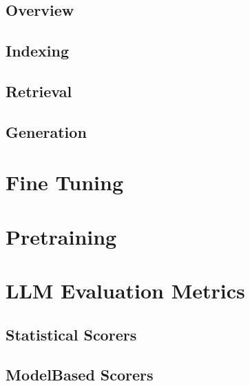 \documentclass[letterpaper,11pt,english]{sphinxmanual}
\begin{document}
\section{Overview}
\label{\detokenize{rag:overview}}

\section{Indexing}
\label{\detokenize{rag:indexing}}

\section{Retrieval}
\label{\detokenize{rag:retrieval}}

\section{Generation}
\label{\detokenize{rag:generation}}
\sphinxstepscope


\chapter{Fine Tuning}
\label{\detokenize{finetuning:fine-tuning}}\label{\detokenize{finetuning:finetuning}}\label{\detokenize{finetuning::doc}}
\sphinxstepscope


\chapter{Pre\sphinxhyphen{}training}
\label{\detokenize{pretraining:pre-training}}\label{\detokenize{pretraining:pretraining}}\label{\detokenize{pretraining::doc}}
\sphinxstepscope


\chapter{LLM Evaluation Metrics}
\label{\detokenize{evaluation:llm-evaluation-metrics}}\label{\detokenize{evaluation:evaluation}}\label{\detokenize{evaluation::doc}}

\section{Statistical Scorers}
\label{\detokenize{evaluation:statistical-scorers}}

\section{Model\sphinxhyphen{}Based Scorers}
\label{\detokenize{evaluation:model-based-scorers}}
\sphinxstepscope
\end{document}
